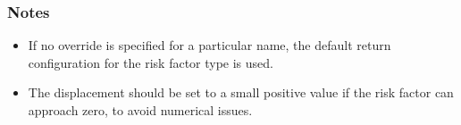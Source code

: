 \subsubsection*{Notes}

\begin{itemize}
    \item If no override is specified for a particular name, the default return configuration for the risk factor type is used.
    \item The displacement should be set to a small positive value if the risk factor can approach zero, to avoid numerical issues.
\end{itemize}